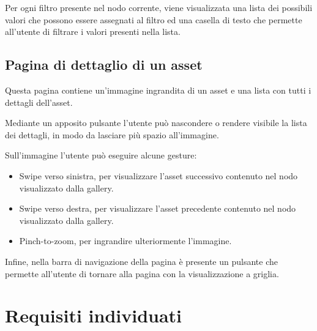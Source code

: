Per ogni filtro presente nel nodo corrente, viene visualizzata una lista dei possibili valori che possono essere assegnati al filtro ed una casella di testo che permette all'utente di filtrare i valori presenti nella lista.

\subsection{Pagina di dettaglio di un asset}\label{sec:pag-dettaglio-asset}

Questa pagina contiene un'immagine ingrandita di un asset e una lista con tutti i dettagli dell'asset.

Mediante un apposito pulsante l'utente può nascondere o rendere visibile la lista dei dettagli, in modo da lasciare più spazio all'immagine.

Sull'immagine l'utente può eseguire alcune gesture:
\begin{itemize}
\item \gls{Swipe} verso sinistra, per visualizzare l'asset successivo contenuto nel nodo visualizzato dalla gallery.
\item Swipe verso destra, per visualizzare l'asset precedente contenuto nel nodo visualizzato dalla gallery.
\item Pinch-to-zoom, per ingrandire ulteriormente l'immagine.
\end{itemize}

Infine, nella barra di navigazione della pagina è presente un pulsante che permette all'utente di tornare alla pagina con la visualizzazione a griglia.


\section{Requisiti individuati}

